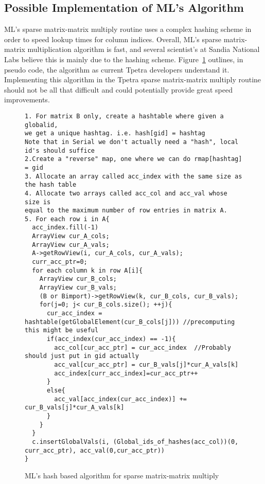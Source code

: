 \documentclass[pdf,12pt]{SANDreport}
\begin{document}
\subsection{Possible Implementation of ML's Algorithm}
ML's sparse matrix-matrix multiply routine uses a complex hashing scheme in order to speed lookup times for 
column indices. Overall, ML's sparse matrix-matrix multiplication algorithm is fast, and several scientist's at Sandia 
National Labs believe this is mainly due to the hashing scheme. Figure~\ref{hashalgo} outlines, in pseudo code, the 
algorithm as current Tpetra developers understand it. Implementing this algorithm in the Tpetra sparse matrix-matrix 
multiply routine should not be all that difficult and could potentially provide great speed improvements.

\begin{figure}
\centering
{\footnotesize
\begin{verbatim}
1. For matrix B only, create a hashtable where given a globalid, 
we get a unique hashtag. i.e. hash[gid] = hashtag
Note that in Serial we don't actually need a "hash", local id's should suffice
2.Create a "reverse" map, one where we can do rmap[hashtag] = gid
3. Allocate an array called acc_index with the same size as the hash table
4. Allocate two arrays called acc_col and acc_val whose size is 
equal to the maximum number of row entries in matrix A.
5. For each row i in A{
  acc_index.fill(-1)
  ArrayView cur_A_cols;
  ArrayView cur_A_vals;
  A->getRowView(i, cur_A_cols, cur_A_vals);
  curr_acc_ptr=0;
  for each column k in row A[i]{
    ArrayView cur_B_cols;
    ArrayView cur_B_vals;
    (B or Bimport)->getRowView(k, cur_B_cols, cur_B_vals);
    for(j=0; j< cur_B_cols.size(); ++j){
      cur_acc_index = hashtable(getGlobalElement(cur_B_cols[j])) //precomputing this might be useful
      if(acc_index(cur_acc_index) == -1){
        acc_col[cur_acc_ptr] = cur_acc_index  //Probably should just put in gid actually
        acc_val[cur_acc_ptr] = cur_B_vals[j]*cur_A_vals[k]
        acc_index[curr_acc_index]=cur_acc_ptr++
      }
      else{
        acc_val[acc_index(cur_acc_index)] += cur_B_vals[j]*cur_A_vals[k]
      }
    }
  }
  c.insertGlobalVals(i, (Global_ids_of_hashes(acc_col))(0, curr_acc_ptr), acc_val(0,cur_acc_ptr))
}

\end{verbatim}
}
\caption[Hash based algorithm]{ML's hash based algorithm for sparse matrix-matrix multiply}
\label{hashalgo}
\end{figure}
\end{document}
